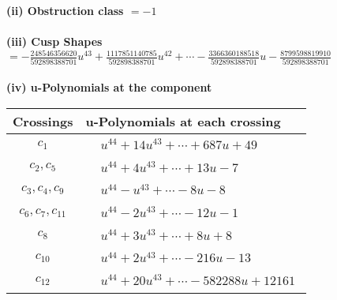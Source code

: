 \documentclass[1p]{elsarticle_modified}
\theoremstyle{definition}
\begin{document}
\flushleft \textbf{(ii) Obstruction class $= -1$}\\~\\
\flushleft \textbf{(iii) Cusp Shapes $= -\frac{248546356620}{592898388701} u^{43}+\frac{1117851140785}{592898388701} u^{42}+\cdots-\frac{3366360188518}{592898388701} u-\frac{8799598819910}{592898388701}$}\\~\\
\newpage\renewcommand{\arraystretch}{1}
\flushleft \textbf{(iv) u-Polynomials at the component}\newline \\
\begin{tabular}{m{50pt}|m{274pt}}
Crossings & \hspace{64pt}u-Polynomials at each crossing \\
\hline $$\begin{aligned}c_{1}\end{aligned}$$&$\begin{aligned}
&u^{44}+14 u^{43}+\cdots+687 u+49
\end{aligned}$\\
\hline $$\begin{aligned}c_{2},c_{5}\end{aligned}$$&$\begin{aligned}
&u^{44}+4 u^{43}+\cdots+13 u-7
\end{aligned}$\\
\hline $$\begin{aligned}c_{3},c_{4},c_{9}\end{aligned}$$&$\begin{aligned}
&u^{44}- u^{43}+\cdots-8 u-8
\end{aligned}$\\
\hline $$\begin{aligned}c_{6},c_{7},c_{11}\end{aligned}$$&$\begin{aligned}
&u^{44}-2 u^{43}+\cdots-12 u-1
\end{aligned}$\\
\hline $$\begin{aligned}c_{8}\end{aligned}$$&$\begin{aligned}
&u^{44}+3 u^{43}+\cdots+8 u+8
\end{aligned}$\\
\hline $$\begin{aligned}c_{10}\end{aligned}$$&$\begin{aligned}
&u^{44}+2 u^{43}+\cdots-216 u-13
\end{aligned}$\\
\hline $$\begin{aligned}c_{12}\end{aligned}$$&$\begin{aligned}
&u^{44}+20 u^{43}+\cdots-582288 u+12161
\end{aligned}$\\
\hline
\end{tabular}\\~\\
\end{document}
